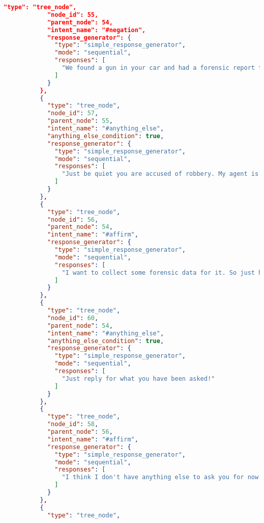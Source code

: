 \begin{appendix}
\begin{lstlisting}[language=json, firstnumber=1]
            "type": "tree_node",
            "node_id": 55,
            "parent_node": 54,
            "intent_name": "#negation",
            "response_generator": {
              "type": "simple_response_generator",
              "mode": "sequential",
              "responses": [
                "We found a gun in your car and had a forensic report for it. And your fingerprints on that gun matches the one on the cash register. So you are being arrested for a robbery. You have a right to remain silent. Anything you say now will be used against you in the court of law. Hope you will enjoy your imprisonment. Hope to not see you again!"
              ]
            }
          },
          {
            "type": "tree_node",
            "node_id": 57,
            "parent_node": 55,
            "intent_name": "#anything_else",
            "anything_else_condition": true,
            "response_generator": {
              "type": "simple_response_generator",
              "mode": "sequential",
              "responses": [
                "Just be quiet you are accused of robbery. My agent is on his way to take you with him."
              ]
            }
          },
          {
            "type": "tree_node",
            "node_id": 56,
            "parent_node": 54,
            "intent_name": "#affirm",
            "response_generator": {
              "type": "simple_response_generator",
              "mode": "sequential",
              "responses": [
                "I want to collect some forensic data for it. So just hand it over to me. My owner will collect it from you soon."
              ]
            }
          },
          {
            "type": "tree_node",
            "node_id": 60,
            "parent_node": 54,
            "intent_name": "#anything_else",
            "anything_else_condition": true,
            "response_generator": {
              "type": "simple_response_generator",
              "mode": "sequential",
              "responses": [
                "Just reply for what you have been asked!"
              ]
            }
          },
          {
            "type": "tree_node",
            "node_id": 58,
            "parent_node": 56,
            "intent_name": "#affirm",
            "response_generator": {
              "type": "simple_response_generator",
              "mode": "sequential",
              "responses": [
                "I think I don't have anything else to ask you for now. Once I will have the report, I will enquire you again. Bye!"
              ]
            }
          },
          {
            "type": "tree_node",

\end{lstlisting}
\end{appendix}
